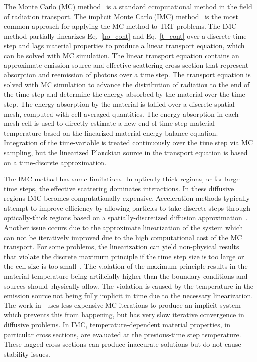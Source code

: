 \documentclass[11pt]{article}
\begin{document}
The Monte Carlo (MC) method~\cite{shultis_mc} is a standard computational method in
the field of radiation transport.
 The implicit Monte Carlo (IMC) method~\cite{fnc}
is the most common approach for applying the MC method to TRT problems. The IMC
method partially linearizes Eq.~\eqref{ho_cont} and Eq.~\eqref{t_cont} over a discrete time
step and lags material properties to produce a linear transport equation, which can be solved with MC
simulation.  The linear transport equation contains an approximate emission source
and effective scattering cross section that represent
absorption and reemission of photons over a time step.  The transport equation is
solved with MC simulation 
to advance the distribution of radiation to the end of the time step and determine
the energy absorbed by the material over the time step.  The energy absorption by
the material is tallied over a discrete spatial mesh, computed with cell-averaged
quantities.
  The energy absorption in each mesh cell is used to directly estimate
a new end of time step material temperature based on the linearized material
energy balance equation. Integration of the
time-variable is treated continuously over the time step via MC sampling, but the
linearized Planckian source in the transport equation is based on a time-discrete
approximation.
  

The IMC method has some limitations.  In optically thick regions, or for
large time steps, the
effective scattering dominates interactions.  In these diffusive regions IMC
becomes computationally expensive. Acceleration methods typically attempt to improve
efficiency by allowing particles to take discrete steps through optically-thick
regions based on a spatially-discretized diffusion approximation~\cite{imd,ddmc}. 
Another issue occurs due to the approximate linearization of the system which can not
be iteratively improved due
to the high computational cost of the MC transport.  For some problems, the
linearization can yield non-physical results that violate the discrete maximum
principle if the time step size is too large or the cell size is too
small~\cite{wollaber2013discrete}.  The violation of the maximum principle results in
the material temperature being artificially higher than the boundary conditions and
sources should physically allow.  The violation is caused by the temperature in the
emission source not being fully implicit in time due to the necessary linearization.
The work in~\cite{iimc_gentile} uses less-expensive MC iterations to produce an implicit system
which prevents this from happening, but has very slow iterative convergence in diffusive
problems.  
In IMC, temperature-dependent
material properties, in particular cross sections, are evaluated at the previous-time
step temperature. These lagged cross sections can produce inaccurate solutions but
do not cause stability issues.  
\end{document}
